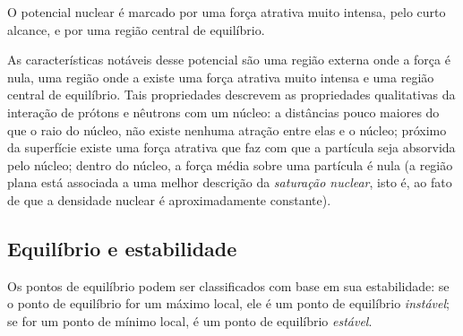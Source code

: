 \begin{marginfigure}[2cm]
\centering
{}
\caption{O potencial nuclear é marcado por uma força atrativa muito intensa, pelo curto alcance, e por uma região central de equilíbrio.}
\end{marginfigure}

As características notáveis desse potencial são uma região externa onde a força é nula, uma região onde a existe uma força atrativa muito intensa e uma região central de equilíbrio. Tais propriedades descrevem as propriedades qualitativas da interação de prótons e nêutrons com um núcleo: a distâncias pouco maiores do que o raio do núcleo, não existe nenhuma atração entre elas e o núcleo; próximo da superfície existe uma força atrativa que faz com que a partícula seja absorvida pelo núcleo; dentro do núcleo, a força média sobre uma partícula é nula (a região plana está associada\cite{Matta2017} a uma melhor descrição da \emph{saturação nuclear}, isto é, ao fato de que a densidade nuclear é aproximadamente constante).

\subsection{Equilíbrio e estabilidade}

Os pontos de equilíbrio podem ser classificados com base em sua estabilidade: se o ponto de equilíbrio for um máximo local, ele é um ponto de equilíbrio \emph{instável}; se for um ponto de mínimo local, é um ponto de equilíbrio \emph{estável}.

